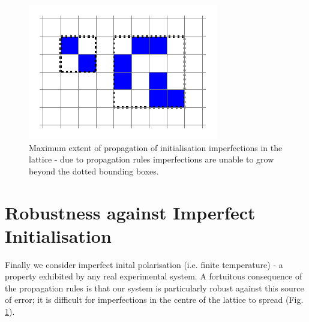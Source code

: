 \begin{figure}
  \begin{center}
    \includegraphics[scale=1]{assets/impurity}
  \end{center}
  \caption{Maximum extent of propagation of initialisation
    imperfections in the lattice - due to propagation rules
  imperfections are unable to grow beyond the dotted bounding boxes. }
  \label{impurities}
\end{figure}


\section{Robustness against Imperfect Initialisation}

Finally we consider imperfect inital polarisation (i.e. finite temperature) - a property exhibited by any real experimental system.  
A fortuitous consequence of the propagation rules is that our system is particularly robust against this source of error; it is difficult for imperfections in the centre of the lattice to spread (Fig. \ref{impurities}).

